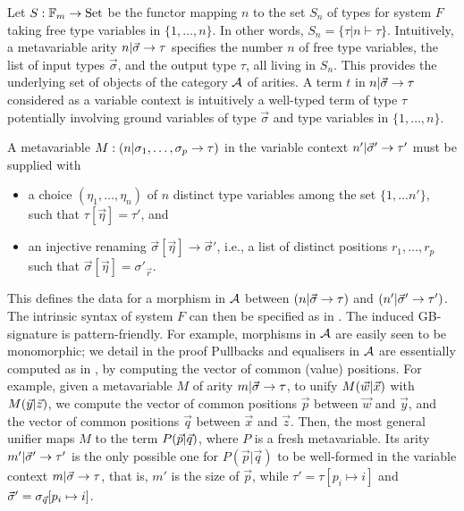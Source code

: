 Let $S:\mathbb{F}_{m}\rightarrow\Set$ be the functor mapping $n$
to the set $S_{n}$ of types for system $F$ taking free type variables
in $\{1,\dots,n\}$. In other words, $S_{n}=\{\tau|n\vdash\tau\}$.
Intuitively, a metavariable arity $n\Fsep\vec{\sigma}\arSep\tau$
specifies the number $n$ of free type variables, the list of input
types $\vec{\sigma}$, and the output type $\tau$, all living in
$S_{n}$. This provides the underlying set of objects of the category
${\cal A}$ of arities. A term $t$ in $n\Fsep\vec{\sigma}\arSep\tau$
considered as a variable context is intuitively a well-typed term
of type $\tau$ potentially involving ground variables of type $\vec{\sigma}$
and type variables in $\{1,\dots,n\}$.

A metavariable $M:(n\Fsep\sigma_{1},\dots,\sigma_{p}\arSep\tau)$
in the variable context $n'\Fsep\vec{\sigma}'\arSep\tau'$ must be
supplied with
\begin{itemize}
\item a choice $(\eta_{1},\dots,\eta_{n})$ of $n$ distinct type variables
among the set $\{1,\dots n'\}$, such that $\tau[\vec{\eta}]=\tau'$,
and 
\item an injective renaming $\vec{\sigma}[\vec{\eta}]\rightarrow\vec{\sigma}'$,
i.e., a list of distinct positions $r_{1},\dots,r_{p}$ such that
$\vec{\sigma}[\vec{\eta}]=\sigma'_{\vec{r}}$.
\end{itemize}
This defines the data for a morphism in ${\cal A}$ between $(n\Fsep\vec{\sigma}\arSep\tau)$
and $(n'\Fsep\vec{\sigma}'\arSep\tau')$. The intrinsic syntax of
system $F$ can then be specified as in . The
induced GB-signature is pattern-friendly. For example, morphisms in
${\cal A}$ are easily seen to be monomorphic; we detail in 
the proof  Pullbacks and equalisers in ${\cal A}$ are essentially computed
as in , by computing the vector of common
(value) positions. For example, given a metavariable $M$ of arity
$m\Fsep\vec{\sigma}\arSep\tau$, to unify $M(\vec{w}\Fsep\vec{x})$
with $M(\vec{y}\Fsep\vec{z})$, we compute the vector of common positions
$\vec{p}$ between $\vec{w}$ and $\vec{y}$, and the vector of common
positions $\vec{q}$ between $\vec{x}$ and $\vec{z}$. Then, the
most general unifier maps $M$ to the term $P(\vec{p}\Fsep\vec{q})$,
where $P$ is a fresh metavariable. Its arity $m'\Fsep\vec{\sigma}'\arSep\tau'$
is the only possible one for $P(\vec{p}|\vec{q})$ to be well-formed
in the variable context $m\Fsep\vec{\sigma}\arSep\tau$, that is,
$m'$ is the size of $\vec{p}$, while $\tau'=\tau[p_{i}\mapsto i]$
and $\vec{\sigma}'=\text{\ensuremath{\sigma_{\vec{q}}}}[p_{i}\mapsto i]$.

